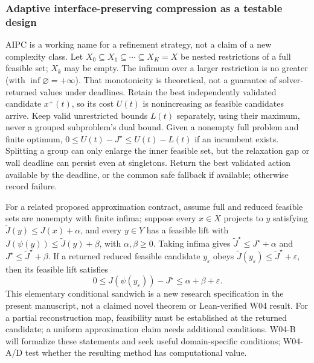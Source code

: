 \documentclass[11pt,letterpaper]{article}
\begin{document}
\subsubsection{Adaptive interface-preserving compression as a testable design}
AIPC is a working name for a refinement strategy, not a claim of a new complexity class. Let $X_0\subseteq X_1\subseteq\cdots\subseteq X_K=X$ be nested restrictions of a full feasible set; $X_k$ may be empty. The infimum over a larger restriction is no greater (with $\inf\varnothing=+\infty$). That monotonicity is theoretical, not a guarantee of solver-returned values under deadlines. Retain the best independently validated candidate $x^+(t)$, so its cost $U(t)$ is nonincreasing as feasible candidates arrive. Keep valid unrestricted bounds $L(t)$ separately, using their maximum, never a grouped subproblem's dual bound. Given a nonempty full problem and finite optimum, $0\le U(t)-J^\star\le U(t)-L(t)$ if an incumbent exists. Splitting a group can only enlarge the inner feasible set, but the relaxation gap or wall deadline can persist even at singletons. Return the best validated action available by the deadline, or the common safe fallback if available; otherwise record failure.

For a related proposed approximation contract, assume full and reduced feasible sets are nonempty with finite infima; suppose every $x\in X$ projects to $y$ satisfying $\widetilde J(y)\le J(x)+\alpha$, and every $y\in Y$ has a feasible lift with $J(\psi(y))\le\widetilde J(y)+\beta$, with $\alpha,\beta\ge0$. Taking infima gives $\widetilde J^\star\le J^\star+\alpha$ and $J^\star\le\widetilde J^\star+\beta$. If a returned reduced feasible candidate $y_\varepsilon$ obeys $\widetilde J(y_\varepsilon)\le\widetilde J^\star+\varepsilon$, then its feasible lift satisfies
\[
 0\le J(\psi(y_\varepsilon))-J^\star\le\alpha+\beta+\varepsilon.
\]
This elementary conditional sandwich is a new research specification in the present manuscript, not a claimed novel theorem or Lean-verified W04 result. For a partial reconstruction map, feasibility must be established at the returned candidate; a uniform approximation claim needs additional conditions. W04-B will formalize these statements and seek useful domain-specific conditions; W04-A/D test whether the resulting method has computational value.
\end{document}
